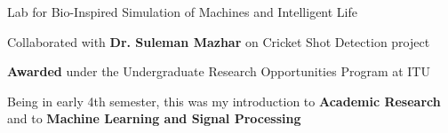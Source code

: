 \begin{cventries}
    \cventry
    {Lab for Bio-Inspired Simulation of Machines and Intelligent Life} %
    {} %
    {} %
    {} %
    {
      \begin{cvitems} %
        \item Collaborated with \textbf{Dr. Suleman Mazhar} on Cricket Shot Detection project
        \item \textbf{Awarded} under the Undergraduate Research Opportunities Program at ITU
        \item Being in early 4th semester, this was my introduction to \textbf{Academic Research} and to \textbf{Machine Learning and Signal Processing}
      \end{cvitems}
    }
    {}

\end{cventries}
